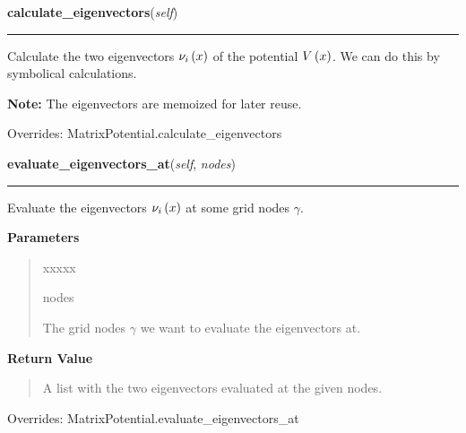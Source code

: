     \vspace{0.5ex}

\hspace{.8\funcindent}\begin{boxedminipage}{\funcwidth}

    \raggedright \textbf{calculate\_eigenvectors}(\textit{self})

    \vspace{-1.5ex}

    \rule{\textwidth}{0.5\fboxrule}
\setlength{\parskip}{2ex}
    Calculate the two eigenvectors $\nu_i\left( x \right)$ of the
    potential $V\left( x \right)$. We can do this by symbolical
    calculations.

\setlength{\parskip}{1ex}

\textbf{Note:} The eigenvectors are memoized for later reuse.

      Overrides: MatrixPotential.calculate\_eigenvectors




    \end{boxedminipage}

    \vspace{0.5ex}

\hspace{.8\funcindent}\begin{boxedminipage}{\funcwidth}

    \raggedright \textbf{evaluate\_eigenvectors\_at}(\textit{self}, \textit{nodes})

    \vspace{-1.5ex}

    \rule{\textwidth}{0.5\fboxrule}
\setlength{\parskip}{2ex}
    Evaluate the eigenvectors $\nu_i\left( x \right)$ at some
    grid nodes $\gamma$.

\setlength{\parskip}{1ex}
      \textbf{Parameters}
      \vspace{-1ex}

      \begin{quote}
        \begin{Ventry}{xxxxx}

          \item[nodes]

          The grid nodes $\gamma$ we want to evaluate the
          eigenvectors at.

        \end{Ventry}

      \end{quote}

      \textbf{Return Value}
    \vspace{-1ex}

      \begin{quote}
      A list with the two eigenvectors evaluated at the given nodes.

      \end{quote}



      Overrides: MatrixPotential.evaluate\_eigenvectors\_at

    \end{boxedminipage}

